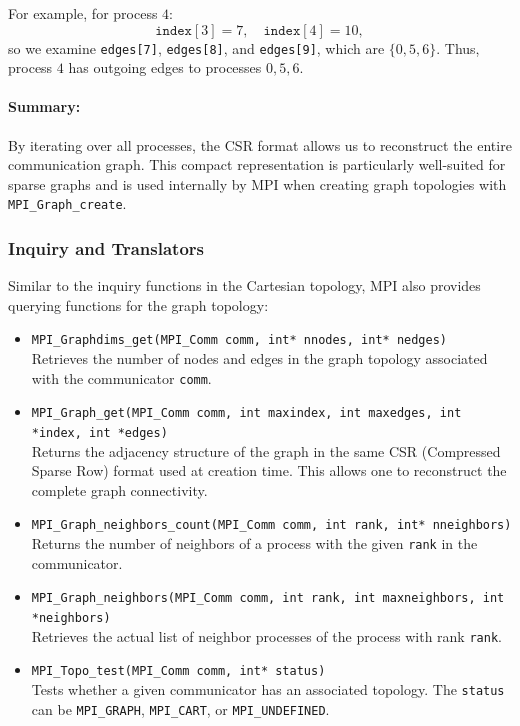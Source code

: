 \documentclass[12pt]{book}
\begin{document}
For example, for process $4$:
\[
\texttt{index}[3] = 7, \quad \texttt{index}[4] = 10,
\]
so we examine \texttt{edges[7]}, \texttt{edges[8]}, and \texttt{edges[9]}, which are $\{0,5,6\}$.  
Thus, process $4$ has outgoing edges to processes $0,5,6$.

\paragraph{Summary:}
By iterating over all processes, the CSR format allows us to reconstruct the entire communication graph. This compact representation is particularly well-suited for sparse graphs and is used internally by MPI when creating graph topologies with \texttt{MPI\_Graph\_create}.

\subsubsection{Inquiry and Translators}

Similar to the inquiry functions in the Cartesian topology, MPI also provides querying functions for the graph topology:

\begin{itemize}
    \item \texttt{MPI\_Graphdims\_get(MPI\_Comm comm, int* nnodes, int* nedges)} \\
    Retrieves the number of nodes and edges in the graph topology associated with the communicator \texttt{comm}.

    \item \texttt{MPI\_Graph\_get(MPI\_Comm comm, int maxindex, int maxedges, int *index, int *edges)} \\
    Returns the adjacency structure of the graph in the same CSR (Compressed Sparse Row) format used at creation time. This allows one to reconstruct the complete graph connectivity.

    \item \texttt{MPI\_Graph\_neighbors\_count(MPI\_Comm comm, int rank, int* nneighbors)} \\
    Returns the number of neighbors of a process with the given \texttt{rank} in the communicator.

    \item \texttt{MPI\_Graph\_neighbors(MPI\_Comm comm, int rank, int maxneighbors, int *neighbors)} \\
    Retrieves the actual list of neighbor processes of the process with rank \texttt{rank}.

    \item \texttt{MPI\_Topo\_test(MPI\_Comm comm, int* status)} \\
    Tests whether a given communicator has an associated topology. The \texttt{status} can be \texttt{MPI\_GRAPH}, \texttt{MPI\_CART}, or \texttt{MPI\_UNDEFINED}.
\end{itemize}
\end{document}
